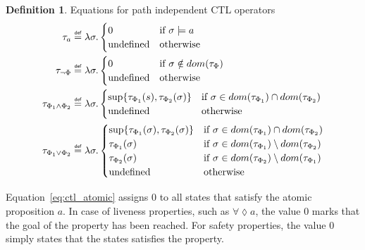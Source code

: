 \documentclass[11pt,a4paper,titlepage]{article}
\theoremstyle{definition}
\newtheorem{definition}{Definition}[section]
\newcommand\eqdef{\mathrel{\overset{\makebox[0pt]{\mbox{\normalfont\tiny\sffamily def}}}{=}}}
\begin{document}
\begin{definition}\label{def:ctl_semantics_basic}
    Equations for path independent CTL operators
    \setlength{\jot}{15pt}
    \begin{align}
        \tau_a &\eqdef \lambda \sigma.
        \begin{cases}
            0                   & \text{if} \ \sigma \models a \\
            \text{undefined}    & \text{otherwise}
        \end{cases}\label{eq:ctl_atomic}\\
        \tau_{\neg \Phi} &\eqdef \lambda \sigma.
        \begin{cases}
            0                   & \text{if} \ \sigma \notin dom(\tau_{\Phi}) \\
            \text{undefined}    & \text{otherwise}
        \end{cases}\label{eq:ctl_not}
        \\
        \tau_{\Phi_1 \land \Phi_2} &\eqdef \lambda \sigma.
        \begin{cases}
            \sup\{\tau_{\Phi_1}(s), \tau_{\Phi_2}(\sigma)\} 
                                &\text{if } \sigma \in dom(\tau_{\Phi_1}) \cap dom(\tau_{\Phi_2}) \\
            \text{undefined}    & \text{otherwise}
        \end{cases}\label{eq:ctl_and}\\
        \tau_{\Phi_1 \lor \Phi_2} &\eqdef \lambda \sigma.
        \begin{cases}
            \sup\{\tau_{\Phi_1}(\sigma), \tau_{\Phi_2}(\sigma)\}         & \text{if} \ \sigma \in dom(\tau_{\Phi_1}) \cap dom(\tau_{\Phi_2}) \\
            \tau_{\Phi_1}(\sigma)                                        & \text{if} \ \sigma \in dom(\tau_{\Phi_1}) \setminus dom(\tau_{\Phi_2}) \\
            \tau_{\Phi_2}(\sigma)                                        & \text{if} \ \sigma \in dom(\tau_{\Phi_2}) \setminus dom(\tau_{\Phi_1}) \\
            \text{undefined}    & \text{otherwise}
        \end{cases}\label{eq:ctl_or}
    \end{align}
\end{definition}

Equation~\ref{eq:ctl_atomic} assigns $0$ to all states that satisfy the atomic proposition $a$. 
In case of liveness properties, such as $\forall\lozenge a$, the value $0$ marks that the goal of the property has been reached. 
For safety properties, the value $0$ simply states that the states satisfies the property. \\
\end{document}
